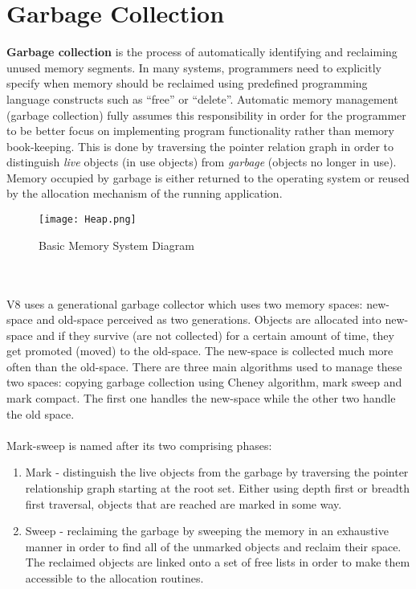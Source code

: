 \documentclass{l4proj}
\begin{document}
\section{Garbage Collection}
\label{gcexplained}
\hspace*{3em}\textbf{Garbage collection} is the process of automatically identifying and reclaiming unused memory segments. In many systems, programmers need to explicitly specify when memory should be reclaimed using predefined programming language constructs such as ``free'' or ``delete''. Automatic memory management (garbage collection) fully assumes this responsibility in order for the programmer to be better focus on implementing program functionality rather than memory book-keeping. This is done by traversing the pointer relation graph in order to distinguish \textit{live} objects (in use objects) from \textit{garbage} (objects no longer in use). Memory occupied by garbage is either returned to the operating system or reused by the allocation mechanism of the running application.\cite{gc}
\begin{figure}[!ht]
  \centering
    \texttt{[image: Heap.png]}
    \caption{Basic Memory System Diagram}
\end{figure}
\\\\
\hspace*{3em} V8 uses a generational garbage collector which uses two memory spaces: new-space and old-space perceived as two generations. Objects are allocated into new-space and if they survive (are not collected) for a certain amount of time, they get promoted (moved) to the old-space. The new-space is collected much more often than the old-space. There are three main algorithms used to manage these two spaces: copying garbage collection using Cheney algorithm, mark sweep and mark compact. The first one handles the new-space while the other two handle the old space. 
\\\\
Mark-sweep is named after its two comprising phases: 
\begin{enumerate}
\item Mark - distinguish the live objects from the garbage by traversing the pointer relationship graph starting at the root set. Either using depth first or breadth first traversal, objects that are reached are marked in some way. 
\item Sweep - reclaiming the garbage by sweeping the memory in an exhaustive manner in order to find all of the unmarked objects and reclaim their space. The reclaimed objects are linked onto a set of free lists in order to make them accessible to the allocation routines.
\end{enumerate}
\end{document}
